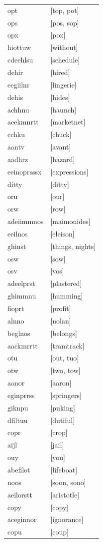 \documentclass{article}
\begin{document}
\begin{tabular}{ll}
opt & [top, pot] \\
ops & [pos, sop] \\
opx & [pox] \\
hiottuw & [without] \\
cdeehlsu & [schedule] \\
dehir & [hired] \\
eegiilnr & [lingerie] \\
dehis & [hides] \\
achhnu & [haunch] \\
aeekmnrtt & [marketnet] \\
cchku & [chuck] \\
aantv & [avant] \\
aadhrz & [hazard] \\
eeinoprsssx & [expressions] \\
ditty & [ditty] \\
oru & [our] \\
orw & [row] \\
adeiimmnos & [maimonides] \\
eeilnos & [eleison] \\
ghinst & [things, nights] \\
osw & [sow] \\
osv & [vos] \\
adeelprst & [plastered] \\
ghimmnu & [humming] \\
fioprt & [profit] \\
alnno & [nolan] \\
beglnos & [belongs] \\
aackmrrtt & [tramtrack] \\
otu & [out, tuo] \\
otw & [two, tow] \\
aanor & [aaron] \\
eginprrss & [springers] \\
giknpu & [puking] \\
dfiltuu & [dutiful] \\
copr & [crop] \\
aijl & [jail] \\
ouy & [you] \\
abefilot & [lifeboat] \\
noos & [soon, sono] \\
aeilorstt & [aristotle] \\
copy & [copy] \\
aceginnor & [ignorance] \\
copu & [coup] \\

\end{tabular}
\end{document}
